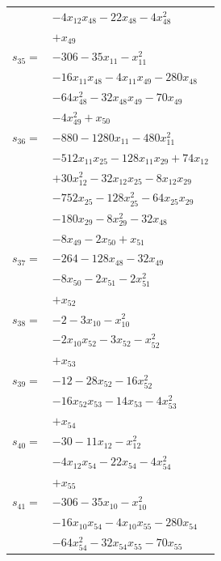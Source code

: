 \begin{longtable}{@{}r@{\;}l@{}}
 & \(\displaystyle -4x_{12}x_{48} -22x_{48} -4x_{48}^{2}\) \\
 & \(\displaystyle +x_{49}\) \\[3pt]
\(s_{35}=\) & \(\displaystyle -306 -35x_{11} -x_{11}^{2}\) \\
 & \(\displaystyle -16x_{11}x_{48} -4x_{11}x_{49} -280x_{48}\) \\
 & \(\displaystyle -64x_{48}^{2} -32x_{48}x_{49} -70x_{49}\) \\
 & \(\displaystyle -4x_{49}^{2} +x_{50}\) \\[3pt]
\(s_{36}=\) & \(\displaystyle -880 -1280x_{11} -480x_{11}^{2}\) \\
 & \(\displaystyle -512x_{11}x_{25} -128x_{11}x_{29} +74x_{12}\) \\
 & \(\displaystyle +30x_{12}^{2} -32x_{12}x_{25} -8x_{12}x_{29}\) \\
 & \(\displaystyle -752x_{25} -128x_{25}^{2} -64x_{25}x_{29}\) \\
 & \(\displaystyle -180x_{29} -8x_{29}^{2} -32x_{48}\) \\
 & \(\displaystyle -8x_{49} -2x_{50} +x_{51}\) \\[3pt]
\(s_{37}=\) & \(\displaystyle -264 -128x_{48} -32x_{49}\) \\
 & \(\displaystyle -8x_{50} -2x_{51} -2x_{51}^{2}\) \\
 & \(\displaystyle +x_{52}\) \\[3pt]
\(s_{38}=\) & \(\displaystyle -2 -3x_{10} -x_{10}^{2}\) \\
 & \(\displaystyle -2x_{10}x_{52} -3x_{52} -x_{52}^{2}\) \\
 & \(\displaystyle +x_{53}\) \\[3pt]
\(s_{39}=\) & \(\displaystyle -12 -28x_{52} -16x_{52}^{2}\) \\
 & \(\displaystyle -16x_{52}x_{53} -14x_{53} -4x_{53}^{2}\) \\
 & \(\displaystyle +x_{54}\) \\[3pt]
\(s_{40}=\) & \(\displaystyle -30 -11x_{12} -x_{12}^{2}\) \\
 & \(\displaystyle -4x_{12}x_{54} -22x_{54} -4x_{54}^{2}\) \\
 & \(\displaystyle +x_{55}\) \\[3pt]
\(s_{41}=\) & \(\displaystyle -306 -35x_{10} -x_{10}^{2}\) \\
 & \(\displaystyle -16x_{10}x_{54} -4x_{10}x_{55} -280x_{54}\) \\
 & \(\displaystyle -64x_{54}^{2} -32x_{54}x_{55} -70x_{55}\) \\

\end{longtable}
